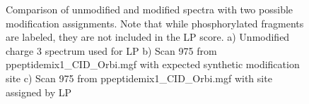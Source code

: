 \begin{figure}[h!]
\caption[Modification assignment comparison]{Comparison of unmodified and modified spectra with two possible modification assignments. Note that while phosphorylated fragments are labeled, they are not included in the LP score. a) Unmodified charge 3 spectrum used for LP b) Scan 975 from  ppeptidemix1\_CID\_Orbi.mgf with expected synthetic modification site c) Scan 975 from  ppeptidemix1\_CID\_Orbi.mgf with site assigned by LP}
\label{fig:charge3Incorrect}
\end{figure} 